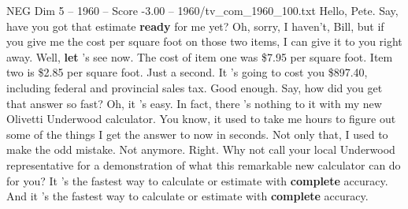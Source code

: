 \begin{textsample}{NEG Dim 5 – 1960 – Score -3.00 – 1960/tv\_com\_1960\_100.txt}  \label{ex:f5_neg_008}
Hello, Pete.
Say, have you got that estimate \textbf{ready} for me yet?
Oh, sorry, I haven't, Bill, but if you give me the cost per square foot on those two items, I can give it to you right away.
Well, \textbf{let} 's see now.
The cost of item one was \$7.95 per square foot.
Item two is \$2.85 per square foot.
Just a second.
It 's going to cost you \$897.40, including federal and provincial sales tax.
Good enough.
Say, how did you get that answer so fast?
Oh, it 's easy.
In fact, there 's nothing to it with my new Olivetti Underwood calculator.
You know, it used to take me hours to figure out some of the things I get the answer to now in seconds.
Not only that, I used to make the odd mistake.
Not anymore.
Right.
Why not call your local Underwood representative for a demonstration of what this remarkable new calculator can do for you?
It 's the fastest way to calculate or estimate with \textbf{complete} accuracy.
And it 's the fastest way to calculate or estimate with \textbf{complete} accuracy.

\end{textsample}

